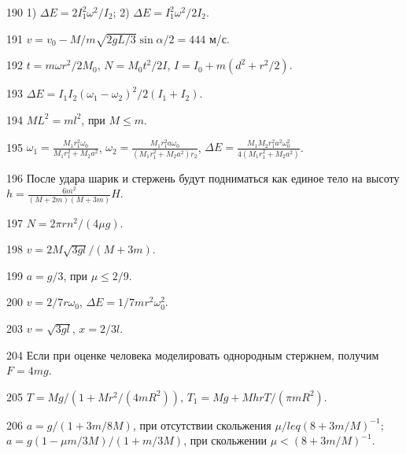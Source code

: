 \begin{Answer}{190}
1) $\Delta E = 2I_1^2\omega^2/I_2$; 2) $\Delta E = I_1^2\omega^2/2I_2$.
\end{Answer}
\begin{Answer}{191}
$v = v_0 -M/m \sqrt{2gL/3} \sin \alpha /2 = 444$ м/с.
\end{Answer}
\begin{Answer}{192}
$t = m\omega r^2 / 2M_0$, $N = M_0t^2/2I$, $I = I_0 + m(d^2 + r^2/2)$.
\end{Answer}
\begin{Answer}{193}
$\Delta E = I_1 I_2 (\omega_1 - \omega_2)^2/ 2(I_1 + I_2)$.
\end{Answer}
\begin{Answer}{194}
$ML^2 = ml^2$, при $M \leq m$.
\end{Answer}
\begin{Answer}{195}
$\omega_1 = \frac{M_1r_1^2\omega_0}{M_1r_1^2 + M_2a^2}$, $\omega_2 = \frac{M_1r_1^2 a \omega_0}{(M_1r_1^2 + M_2a^2)r_2}$, $\Delta E = \frac{M_1 M_2r_1^2a^2\omega_0^2}{4(M_1r_1^2 + M_2a^2)}$.
\end{Answer}
\begin{Answer}{196}
После удара шарик и стержень будут подниматься как единое тело на высоту $h = \frac{6m^2}{(M+2m)(M+3m)}H$.
\end{Answer}
\begin{Answer}{197}
$N = 2\pi r n^2/(4 \mu g)$.
\end{Answer}
\begin{Answer}{198}
$v = 2M\sqrt{3gl}/(M+3m)$.
\end{Answer}
\begin{Answer}{199}
$a = g/3$, при $\mu \leq 2/9$.
\end{Answer}
\begin{Answer}{200}
$v = 2/7r \omega_0$, $\Delta E = 1/7 mr^2 \omega_0^2$.
\end{Answer}
\begin{Answer}{203}
$v = \sqrt{3gl}$, $x = 2/3l$.
\end{Answer}
\begin{Answer}{204}
Если при оценке человека моделировать однородным стержнем, получим $F = 4mg$.
\end{Answer}
\begin{Answer}{205}
$T = Mg/(1 + Mr^2/(4mR^2))$, $T_1 = Mg + MhrT/(\pi m R^2)$.
\end{Answer}
\begin{Answer}{206}
$a = g/(1+3m/8M)$, при отсутствии скольжения $\mu /leq (8+3m/M)^{-1}$; $a = g(1 - \mu m/3M)/(1+m/3M)$, при скольжении $\mu < (8+3m/M)^{-1}$.
\end{Answer}
